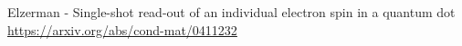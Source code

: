

Elzerman - Single-shot read-out of an individual electron spin in a quantum dot
\url{https://arxiv.org/abs/cond-mat/0411232}
